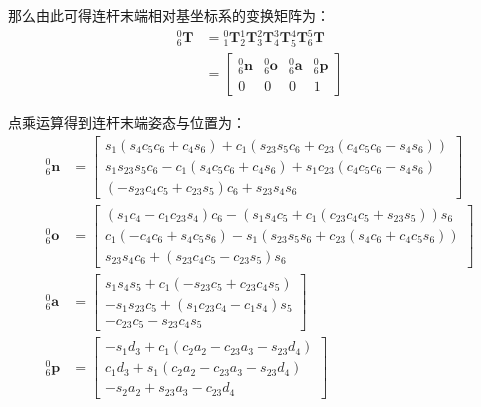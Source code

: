 \documentclass[cn,11pt,chinese,blue,bibstyle=ieeetr]{elegantbook}
\begin{document}
那么由此可得连杆末端相对基坐标系的变换矩阵为：
\begin{equation}
\begin{aligned}
{_6^0\bm{T}} &= {_1^0\bm{T}}{_2^1\bm{T}}{_3^2\bm{T}}{_4^3\bm{T}}{_5^4\bm{T}}{_6^5\bm{T}} \\
&=\begin{bmatrix}
{_6^0\bm{n}} & {_6^0\bm{o}} & {_6^0\bm{a}} & {_6^0\bm{p}} \\
0            & 0            & 0            & 1
\end{bmatrix}
\end{aligned}
\end{equation}

点乘运算得到连杆末端姿态与位置为：
\begin{equation}\label{puma560_mdh_direct_kinematics_equations}
\begin{aligned}
{_6^0\bm{n}} &= \begin{bmatrix}
	s_1 (s_4 c_5 c_6 + c_4 s_6) + c_1 (s_{23} s_5 c_6 + c_{23} (c_4 c_5 c_6 - s_4 s_6)) \\
	s_1 s_{23} s_5 c_6 - c_1 (s_4 c_5 c_6 + c_4 s_6) + s_1 c_{23} (c_4 c_5 c_6 - s_4 s_6) \\
	(-s_{23} c_4 c_5 + c_{23} s_5)c_6 + s_{23} s_4 s_6
\end{bmatrix} \\
{_6^0\bm{o}} &= \begin{bmatrix}
	(s_1c_4-c_1c_{23}s_4)c_6-(s_1s_4c_5+c_1(c_{23}c_4c_5+s_{23}s_5))s_6 \\
	c_1(-c_4c_6+s_4c_5s_6)-s_1(s_{23}s_5s_6+c_{23}(s_4c_6+c_4c_5s_6)) \\
	s_{23}s_4c_6+(s_{23}c_4c_5-c_{23}s_5)s_6
\end{bmatrix} \\
{_6^0\bm{a}} &= \begin{bmatrix}
	s_1s_4s_5+c_1(-s_{23}c_5+c_{23}c_4s_5) \\
	-s_1s_{23}c_5+(s_1c_{23}c_4-c_1s_4)s_5 \\
	-c_{23}c_5-s_{23}c_4s_5
\end{bmatrix} \\
{_6^0\bm{p}} &= \begin{bmatrix}
	-s_1d_3+c_1(c_2a_2-c_{23}a_3-s_{23}d_4) \\
	c_1d_3+s_1(c_2a_2-c_{23}a_3-s_{23}d_4) \\
	-s_2a_2+s_{23}a_3-c_{23}d_4
\end{bmatrix}
\end{aligned}
\end{equation}
\end{document}
